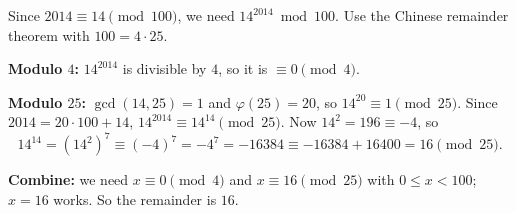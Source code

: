 Since $2014\equiv14\pmod{100}$, we need $14^{2014}\bmod100$. Use the Chinese remainder theorem with $100=4\cdot25$.

\textbf{Modulo $4$:} $14^{2014}$ is divisible by $4$, so it is $\equiv0\pmod4$.

\textbf{Modulo $25$:} $\gcd(14,25)=1$ and $\varphi(25)=20$, so $14^{20}\equiv1\pmod{25}$. Since $2014=20\cdot100+14$, $14^{2014}\equiv14^{14}\pmod{25}$. Now $14^2=196\equiv-4$, so
\[
14^{14}=(14^2)^7\equiv(-4)^7=-4^7=-16384\equiv-16384+16400=16\pmod{25}.
\]

\textbf{Combine:} we need $x\equiv0\pmod4$ and $x\equiv16\pmod{25}$ with $0\le x<100$; $x=16$ works. So the remainder is $\boxed{16}$.
